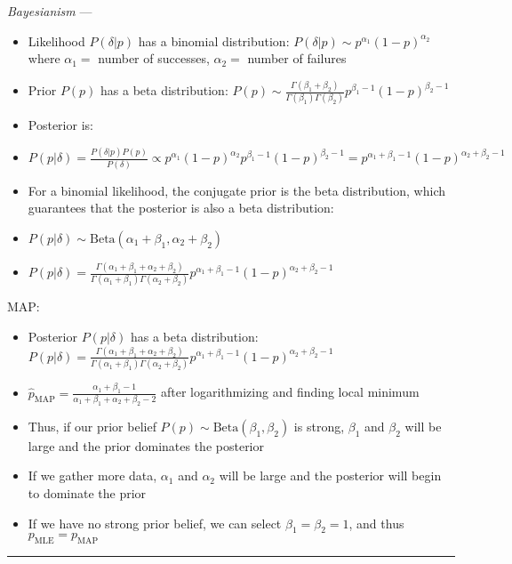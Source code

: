\emph{Bayesianism} --- 
\begin{itemize}
    \item Likelihood $P(\delta |p)$ has a binomial distribution: $P(\delta |p) \sim p^{ \alpha _1} (1-p)^{ \alpha _2}$ where $ \alpha _1 =$ number of successes, $ \alpha _2 =$ number of failures
    \item Prior $P(p)$ has a beta distribution: $P(p) \sim \frac{\Gamma (\beta_1 + \beta_2)}{\Gamma (\beta_1) \Gamma (\beta_2)} p^{ \beta _1 - 1} (1-p)^{ \beta _2 - 1}$
    \item Posterior is:
    \item $P(p |\delta) = \frac{P(\delta |p)P(p)}{P(\delta)} \propto p^{\alpha_1} (1-p)^{\alpha_2} p^{\beta_1-1} (1-p)^{\beta_2-1} = p^{\alpha_1 + \beta_1 - 1} (1-p)^{\alpha_2 + \beta_2 - 1}$
    \item For a binomial likelihood, the conjugate prior is the beta distribution, which guarantees that the posterior is also a beta distribution:
    \item $P(p | \delta) \sim \text{Beta}(\alpha_1 + \beta_1, \alpha_2 + \beta_2)$
    \item $P(p | \delta) = \frac{\Gamma(\alpha_1 + \beta_1 + \alpha_2 + \beta_2)}{\Gamma(\alpha_1 + \beta_1) \Gamma(\alpha_2 + \beta_2)} p^{\alpha_1 + \beta_1 - 1} (1-p)^{\alpha_2 + \beta_2 - 1}$
\end{itemize}
MAP:
\begin{itemize}
    \item Posterior $P(p |\delta)$ has a beta distribution: $P(p | \delta) = \frac{\Gamma(\alpha_1 + \beta_1 + \alpha_2 + \beta_2)}{\Gamma(\alpha_1 + \beta_1) \Gamma(\alpha_2 + \beta_2)} p^{\alpha_1 + \beta_1 - 1} (1-p)^{\alpha_2 + \beta_2 - 1}$
    \item $\hat{p}_{\text{MAP}} = \frac{\alpha_1 + \beta_1 - 1}{\alpha_1 + \beta_1 + \alpha_2 + \beta_2 - 2}$ after logarithmizing and finding local minimum
    \item Thus, if our prior belief $P(p) \sim \text{Beta}(\beta_1, \beta_2)$ is strong, $\beta_1$ and $\beta_2$ will be large and the prior dominates the posterior
    \item If we gather more data, $\alpha_1$ and $\alpha_2$ will be large and the posterior will begin to dominate the prior
    \item If we have no strong prior belief, we can select $\beta_1 = \beta_2 = 1$, and thus $p_{\text{MLE}} = p_{\text{MAP}}$
\end{itemize}

{\color{black}\hrule height 0.001mm}

